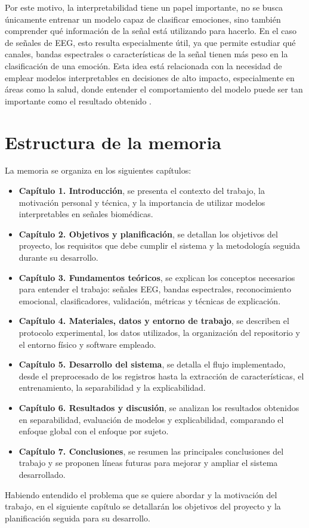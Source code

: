 Por este motivo, la interpretabilidad tiene un papel importante, no se busca únicamente entrenar un modelo capaz de clasificar emociones, sino también comprender qué información de la señal está utilizando para hacerlo. En el caso de señales de \ac{EEG}, esto resulta especialmente útil, ya que permite estudiar qué canales, bandas espectrales o características de la señal tienen más peso en la clasificación de una emoción. Esta idea está relacionada con la necesidad de emplear modelos interpretables en decisiones de alto impacto, especialmente en áreas como la salud, donde entender el comportamiento del modelo puede ser tan importante como el resultado obtenido \cite{rudin2019interpretable}.

\section{Estructura de la memoria}

La memoria se organiza en los siguientes capítulos:

\begin{itemize}
    \item \textbf{Capítulo 1. Introducción}, se presenta el contexto del trabajo, la motivación personal y técnica, y la importancia de utilizar modelos interpretables en señales biomédicas.

    \item \textbf{Capítulo 2. Objetivos y planificación}, se detallan los objetivos del proyecto, los requisitos que debe cumplir el sistema y la metodología seguida durante su desarrollo.

    \item \textbf{Capítulo 3. Fundamentos teóricos}, se explican los conceptos necesarios para entender el trabajo: señales \ac{EEG}, bandas espectrales, reconocimiento emocional, clasificadores, validación, métricas y técnicas de explicación.

    \item \textbf{Capítulo 4. Materiales, datos y entorno de trabajo}, se describen el protocolo experimental, los datos utilizados, la organización del repositorio y el entorno físico y software empleado.

    \item \textbf{Capítulo 5. Desarrollo del sistema}, se detalla el flujo implementado, desde el preprocesado de los registros hasta la extracción de características, el entrenamiento, la separabilidad y la explicabilidad.

    \item \textbf{Capítulo 6. Resultados y discusión}, se analizan los resultados obtenidos en separabilidad, evaluación de modelos y explicabilidad, comparando el enfoque global con el enfoque por sujeto.

    \item \textbf{Capítulo 7. Conclusiones}, se resumen las principales conclusiones del trabajo y se proponen líneas futuras para mejorar y ampliar el sistema desarrollado.
\end{itemize}

Habiendo entendido el problema que se quiere abordar y la motivación del trabajo, en el siguiente capítulo se detallarán los objetivos del proyecto y la planificación seguida para su desarrollo.
